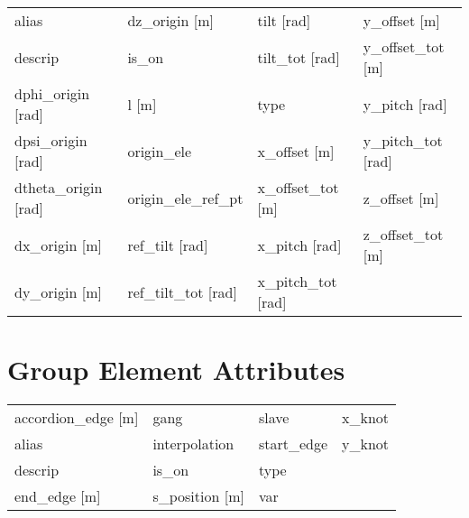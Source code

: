 \begin{tabular}{llll} \toprule
alias                            & dz_origin [m]                    & tilt [rad]                       & y_offset [m]                     \\
descrip                          & is_on                            & tilt_tot [rad]                   & y_offset_tot [m]                 \\
dphi_origin [rad]                & l [m]                            & type                             & y_pitch [rad]                    \\
dpsi_origin [rad]                & origin_ele                       & x_offset [m]                     & y_pitch_tot [rad]                \\
dtheta_origin [rad]              & origin_ele_ref_pt                & x_offset_tot [m]                 & z_offset [m]                     \\
dx_origin [m]                    & ref_tilt [rad]                   & x_pitch [rad]                    & z_offset_tot [m]                 \\
dy_origin [m]                    & ref_tilt_tot [rad]               & x_pitch_tot [rad]                &                                  \\
 \bottomrule
 \end{tabular}
 \vfill
 
 \section{Group Element Attributes}
 \label{s:list.group}
 
 \begin{tabular}{llll} \toprule
accordion_edge [m]               & gang                             & slave                            & x_knot                           \\
alias                            & interpolation                    & start_edge                       & y_knot                           \\
descrip                          & is_on                            & type                             &                                  \\
end_edge [m]                     & s_position [m]                   & var                              &                                  \\
 \bottomrule
 \end{tabular}
 \vfill
 
